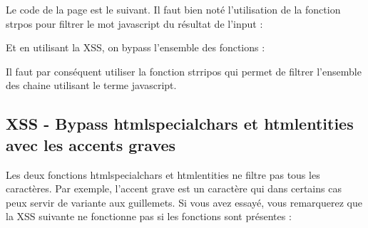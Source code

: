\documentclass{article}
\begin{document}
Le code de la page est le suivant. Il faut bien noté l'utilisation de la fonction strpos pour filtrer le mot javascript du résultat de l'input :
\vspace{0.2cm}\\
\vspace{0.2cm}

Et en utilisant la XSS, on bypass l'ensemble des fonctions :
\vspace{0.2cm}\\
\vspace{0.2cm}

Il faut par conséquent utiliser la fonction strripos qui permet de filtrer l'ensemble des chaine utilisant le terme javascript.

\subsection{XSS - Bypass htmlspecialchars et htmlentities avec les accents graves}

Les deux fonctions htmlspecialchars et htmlentities ne filtre pas tous les caractères. Par exemple, l'accent grave est un caractère qui dans certains cas peux servir de variante aux guillemets. Si vous avez essayé, vous remarquerez que la XSS suivante ne fonctionne pas si les fonctions sont présentes :
\vspace{0.2cm}\\
\vspace{0.2cm}
\end{document}
